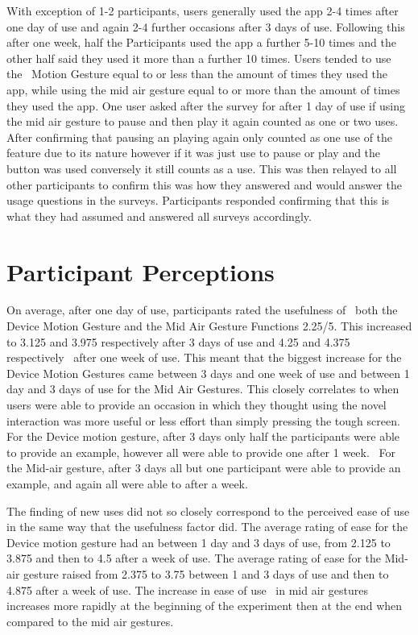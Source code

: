 \documentclass{l4proj}
\begin{document}
With exception of 1-2 participants, users generally used the app 2-4 times after one day of use and again 2-4 further occasions after 3 days of use. Following this after one week, half the Participants used the app a further 5-10 times and the other half said they used it more than a further 10 times. Users tended to use the  Motion Gesture equal to or less than the amount of times they used the app, while using the mid air gesture equal to or more than the amount of times they used the app. One user asked after the survey for after 1 day of use if using the mid air gesture to pause and then play it again counted as one or two uses. After confirming that pausing an playing again only counted as one use of the feature due to its nature however if it was just use to pause or play and the button was used conversely it still counts as a use. This was then relayed to all other participants to confirm this was how they answered and would answer the usage questions in the surveys. Participants responded confirming that this is what they had assumed and answered all surveys accordingly.

\section{Participant Perceptions}

On average, after one day of use, participants rated the usefulness of  both the Device Motion Gesture and the Mid Air Gesture Functions 2.25/5. This increased to 3.125 and 3.975 respectively after 3 days of use and 4.25 and 4.375 respectively  after one week of use. This meant that the biggest increase for the Device Motion Gestures came between 3 days and one week of use and between 1 day and 3 days of use for the Mid Air Gestures. This closely correlates to when users were able to provide an occasion in which they thought using the novel interaction was more useful or less effort than simply pressing the tough screen. For the Device motion gesture, after 3 days only half the participants were able to provide an example, however all were able to provide one after 1 week.  For the Mid-air gesture, after 3 days all but one participant were able to provide an example, and again all were able to after a week.

The finding of new uses did not so closely correspond to the perceived ease of use in the same way that the usefulness factor did. The average rating of ease for the Device motion gesture had an between 1 day and 3 days of use, from 2.125 to 3.875 and then to 4.5 after a week of use. The average rating of ease for the Mid-air gesture raised from 2.375 to 3.75 between 1 and 3 days of use and then to 4.875 after a week of use. The increase in ease of use  in mid air gestures  increases more rapidly at the beginning of the experiment then at the end when compared to the mid air gestures.
\end{document}
